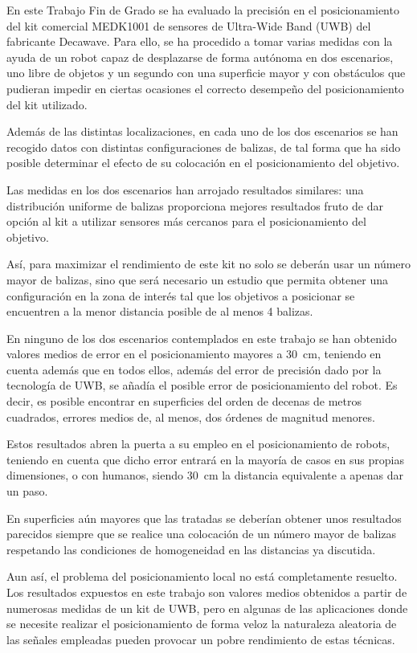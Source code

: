 En este Trabajo Fin de Grado se ha evaluado la precisión en el posicionamiento del kit comercial MEDK1001 de sensores de Ultra-Wide Band (UWB) del fabricante Decawave. Para ello, se ha procedido a tomar varias medidas con la ayuda de un robot capaz de desplazarse de forma autónoma en dos escenarios, uno libre de objetos y un segundo con una superficie mayor y con obstáculos que pudieran impedir en ciertas ocasiones el correcto desempeño del posicionamiento del kit utilizado.

Además de las distintas localizaciones, en cada uno de los dos escenarios se han recogido datos con distintas configuraciones de balizas, de tal forma que ha sido posible determinar el efecto de su colocación en el posicionamiento del objetivo.

Las medidas en los dos escenarios han arrojado resultados similares: una distribución uniforme de balizas proporciona mejores resultados fruto de dar opción al kit a utilizar sensores más cercanos para el posicionamiento del objetivo.

Así, para maximizar el rendimiento de este kit no solo se deberán usar un número mayor de balizas, sino que será necesario un estudio que permita obtener una configuración en la zona de interés tal que los objetivos a posicionar se encuentren a la menor distancia posible de al menos 4 balizas.

En ninguno de los dos escenarios contemplados en este trabajo se han obtenido valores medios de error en el posicionamiento mayores a 30~cm, teniendo en cuenta además que en todos ellos, además del error de precisión dado por la tecnología de UWB, se añadía el posible error de posicionamiento del robot.
Es decir, es posible encontrar en superficies del orden de decenas de metros cuadrados, errores medios de, al menos, dos órdenes de magnitud menores.

Estos resultados abren la puerta a su empleo en el posicionamiento de robots, teniendo en cuenta que dicho error entrará en la mayoría de casos en sus propias dimensiones, o con humanos, siendo 30~cm la distancia equivalente a apenas dar un paso.

En superficies aún mayores que las tratadas se deberían obtener unos resultados parecidos siempre que se realice una colocación de un número mayor de balizas respetando las condiciones de homogeneidad en las distancias ya discutida.

Aun así, el problema del posicionamiento local no está completamente resuelto.
Los resultados expuestos en este trabajo son valores medios obtenidos a partir de numerosas medidas de un kit de UWB, pero en algunas de las aplicaciones donde se necesite realizar el posicionamiento de forma veloz la naturaleza aleatoria de las señales empleadas pueden provocar un pobre rendimiento de estas técnicas.

